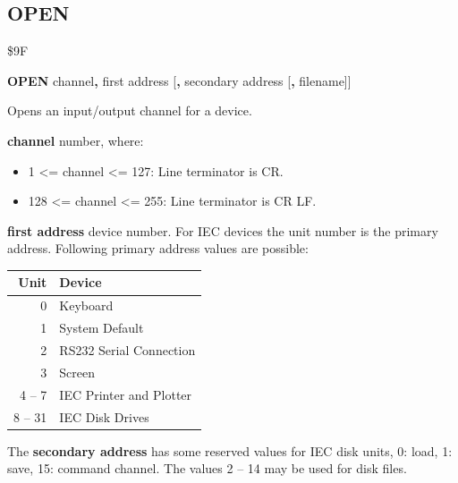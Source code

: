 
\newpage
\subsection{OPEN}
\begin{description}[leftmargin=2cm,style=nextline]
\item [Token:]    \$9F

\item [Format:]   {\bf OPEN} channel{\bf,} first address [{\bf,} secondary address [{\bf,} filename]]

\item [Usage:]    Opens an input/output channel for a device.

                  {\bf channel} number, where:
                  \begin{itemize}
                     \item 1 <= channel <= 127: Line terminator is CR.
                     \item 128 <= channel <= 255: Line terminator is CR LF.
                  \end{itemize}

                  {\bf first address} device number. For IEC devices the unit number is the primary address. Following primary address values are possible:

                  \begin{center}
                  {\setlength{\tabcolsep}{1mm}
                  \begin{tabular}{|r|l|}
                  \hline
                  {\bf Unit}  & {\bf Device} \\
                  \hline
                  0    & Keyboard \\
                  1    & System Default \\
                  2    & RS232 Serial Connection \\
                  3    & Screen \\
                  4 -- 7  & IEC Printer and Plotter \\
                  8 -- 31 & IEC Disk Drives \\
                  \hline
                  \end{tabular}
                  }
                  \end{center}

                  The {\bf secondary address} has some reserved values for IEC disk units, 0: load, 1: save, 15: command channel. The values 2 -- 14 may be used for disk files.


\end{description}
